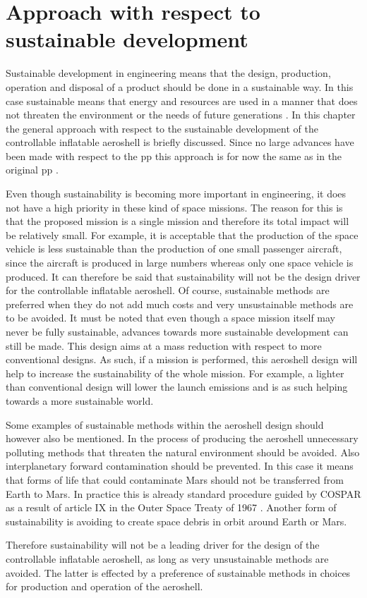 \section{Approach with respect to sustainable development}\label{ch:sustain}


Sustainable development in engineering means that the design, production, operation and disposal of a product should be done in a sustainable way. In this case sustainable means that energy and resources are used in a manner that does not threaten the environment or the needs of future generations \cite{Masud2011}. In this chapter the general approach with respect to the sustainable development of the controllable inflatable aeroshell is briefly discussed. Since no large advances have been made with respect to the \acrfull{pp} this approach is for now the same as in the original \gls{pp} \cite{Balasooriyan2015}.

Even though sustainability is becoming more important in engineering, it does not have a high priority in these kind of space missions. The reason for this is that the proposed mission is a single mission and therefore its total impact will be relatively small. For example, it is acceptable that the production of the space vehicle is less sustainable than the production of one small passenger aircraft, since the aircraft is produced in large numbers whereas only one space vehicle is produced. It can therefore be said that sustainability will not be the design driver for the controllable inflatable aeroshell. Of course, sustainable methods are preferred when they do not add much costs and very unsustainable methods are to be avoided. It must be noted that even though a space mission itself may never be fully sustainable, advances towards more sustainable development can still be made. This design aims at a mass reduction with respect to more conventional designs. As such, if a mission is performed, this aeroshell design will help to increase the sustainability of the whole mission. For example, a lighter than conventional design will lower the launch emissions and is as such helping towards a more sustainable world.

Some examples of sustainable methods within the aeroshell design should however also be mentioned. In the process of producing the aeroshell unnecessary polluting methods that threaten the natural environment should be avoided. Also interplanetary forward contamination should be prevented. In this case it means that forms of life that could contaminate Mars should not be transferred from Earth to Mars. In practice this is already standard procedure guided by COSPAR as a result of article IX in the Outer Space Treaty of 1967 \cite{UnitedNations2008}. Another form of sustainability is avoiding to create space debris in orbit around Earth or Mars.

Therefore sustainability will not be a leading driver for the design of the controllable inflatable aeroshell, as long as very unsustainable methods are avoided. The latter is effected by a preference of sustainable methods in choices for production and operation of the aeroshell.